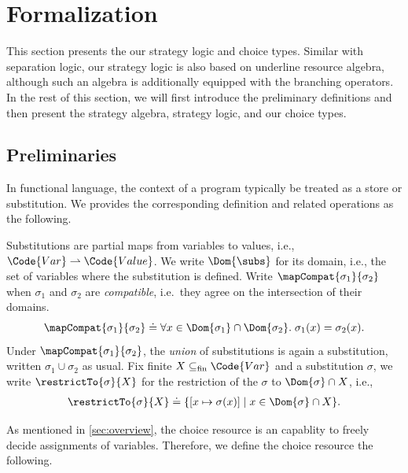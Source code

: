 \section{Formalization}\label{sec:formal}

This section presents the our strategy logic and choice types. Similar with separation logic, our strategy logic is also based on underline resource algebra, although such an algebra is additionally equipped with the branching operators. In the rest of this section, we will first introduce the preliminary definitions and then present the strategy algebra, strategy logic, and our choice types.

\subsection{Preliminaries}

In functional language, the context of a program typically be treated as a store or substitution. We provides the corresponding definition and related operations as the following.

\begin{definition}[Substitution]\label{def:subst-compat}
  Substitutions are partial maps from variables to values, i.e., $\Code{Var} \rightharpoonup \Code{Value}$. We write $\Dom{\subs}$ for its domain, i.e., the set of variables where the substitution is defined.
  Write $\mapCompat{\sigma_1}{\sigma_2}$ when $\sigma_1$ and $\sigma_2$ are
  \emph{compatible}, i.e.\ they agree on the intersection of their domains.
  \[
    \mapCompat{\sigma_1}{\sigma_2}
    \doteq
    \forall x \in \Dom{\sigma_1} \cap \Dom{\sigma_2}.\; \sigma_1(x) = \sigma_2(x).
  \]
  Under $\mapCompat{\sigma_1}{\sigma_2}$, the \emph{union} of substitutions is again a substitution, written $\sigma_1 \cup \sigma_2$ as usual. Fix finite $X \subseteq_{\mathrm{fin}} \Code{Var}$ and a substitution $\sigma$, we write $\restrictTo{\sigma}{X}$ for the restriction of the $\sigma$ to $\Dom{\sigma} \cap X$, i.e.,
  \begin{align*}
    \restrictTo{\sigma}{X} \doteq \{ [x\mapsto \sigma(x)] \mid x \in \Dom{\sigma} \cap X \}.
  \end{align*}
 \end{definition}

 As mentioned in \autoref{sec:overview}, the choice resource is an capablity to freely decide assignments of variables. Therefore, we define the choice resource the following.

